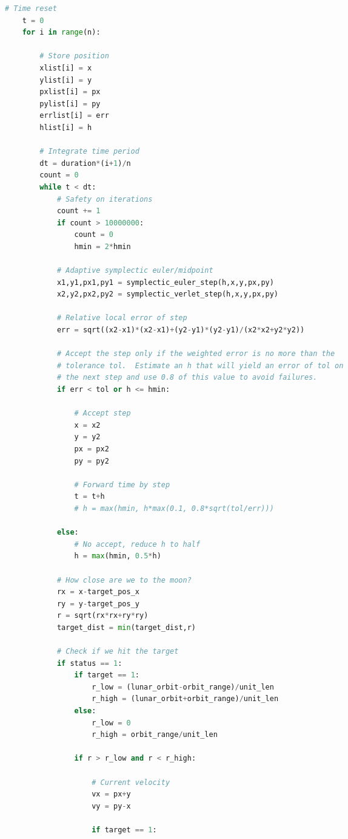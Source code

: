 \begin{adjustwidth*}{0cm}{-0.4cm}
\begin{lstlisting}[language=Python]
    # Time reset
    t = 0
    for i in range(n):

        # Store position
        xlist[i] = x
        ylist[i] = y
        pxlist[i] = px
        pylist[i] = py
        errlist[i] = err
        hlist[i] = h

        # Integrate time period
        dt = duration*(i+1)/n
        count = 0
        while t < dt:
            # Safety on iterations
            count += 1
            if count > 10000000:
                count = 0
                hmin = 2*hmin
            
            # Adaptive symplectic euler/midpoint
            x1,y1,px1,py1 = symplectic_euler_step(h,x,y,px,py)
            x2,y2,px2,py2 = symplectic_verlet_step(h,x,y,px,py)

            # Relative local error of step
            err = sqrt((x2-x1)*(x2-x1)+(y2-y1)*(y2-y1)/(x2*x2+y2*y2))

            # Accept the step only if the weighted error is no more than the
            # tolerance tol.  Estimate an h that will yield an error of tol on
            # the next step and use 0.8 of this value to avoid failures.
            if err < tol or h <= hmin:

                # Accept step
                x = x2
                y = y2
                px = px2
                py = py2

                # Forward time by step
                t = t+h
                # h = max(hmin, h*max(0.1, 0.8*sqrt(tol/err)))

            else:
                # No accept, reduce h to half
                h = max(hmin, 0.5*h)

            # How close are we to the moon?
            rx = x-target_pos_x
            ry = y-target_pos_y
            r = sqrt(rx*rx+ry*ry)
            target_dist = min(target_dist,r)

            # Check if we hit the target
            if status == 1:
                if target == 1:
                    r_low = (lunar_orbit-orbit_range)/unit_len
                    r_high = (lunar_orbit+orbit_range)/unit_len
                else:
                    r_low = 0
                    r_high = orbit_range/unit_len

                if r > r_low and r < r_high:

                    # Current velocity
                    vx = px+y
                    vy = py-x

                    if target == 1:


\end{lstlisting}
\end{adjustwidth*}
